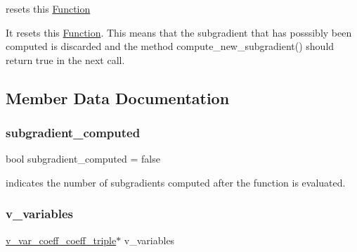 resets this \mbox{\hyperlink{class_s_m_spp__di__unipi__it_1_1_function}{Function}} 

It resets this \mbox{\hyperlink{class_s_m_spp__di__unipi__it_1_1_function}{Function}}. This means that the subgradient that has posssibly been computed is discarded and the method compute\+\_\+new\+\_\+subgradient() should return true in the next call. 

\subsection{Member Data Documentation}
\mbox{\label{class_s_m_spp__di__unipi__it_1_1_d_quad_function_a265d98f018d5a9b7b6b695d31acded40}} 
\subsubsection{\texorpdfstring{subgradient\+\_\+computed}{subgradient\_computed}}
{\footnotesize\ttfamily bool subgradient\+\_\+computed = false\hspace{0.3cm}{\ttfamily [protected]}}

indicates the number of subgradients computed after the function is evaluated. \mbox{\label{class_s_m_spp__di__unipi__it_1_1_d_quad_function_a0cbb4d890e5a9a434857226300da1e31}} 
\subsubsection{\texorpdfstring{v\+\_\+variables}{v\_variables}}
{\footnotesize\ttfamily \mbox{\hyperlink{class_s_m_spp__di__unipi__it_1_1_d_quad_function_adaced695e00a65836eb558a7bfbd85f4}{v\+\_\+var\+\_\+coeff\+\_\+coeff\+\_\+triple}}$\ast$ v\+\_\+variables\hspace{0.3cm}{\ttfamily [protected]}}

